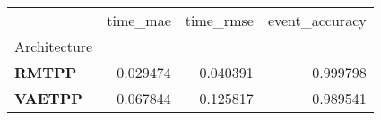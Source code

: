 \begin{tabular}{lrrr}
\toprule
 & time_mae & time_rmse & event_accuracy \\
Architecture &  &  &  \\
\midrule
\textbf{RMTPP} & 0.029474 & 0.040391 & 0.999798 \\
\textbf{VAETPP} & 0.067844 & 0.125817 & 0.989541 \\
\bottomrule
\end{tabular}
